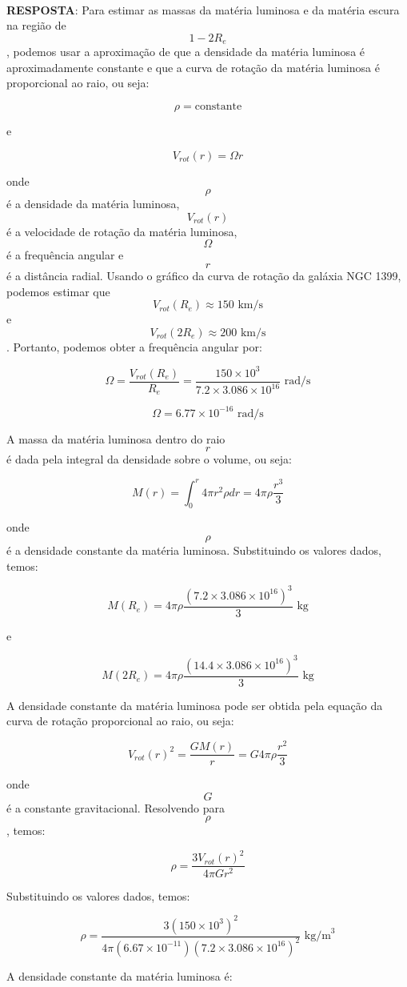 \documentclass[a4paper,12pt]{article}
\begin{document}
\begin{enumerate}
\begin{enumerate}
\noindent\hrulefill\\\textbf{RESPOSTA}: Para estimar as massas da matéria luminosa e da matéria escura na região de $$1-2 R_e$$, podemos usar a aproximação de que a densidade da matéria luminosa é aproximadamente constante e que a curva de rotação da matéria luminosa é proporcional ao raio, ou seja:

$$\rho = \text{constante}$$

e

$$V_{rot}(r) = \Omega r$$

onde $$\rho$$ é a densidade da matéria luminosa, $$V_{rot}(r)$$ é a velocidade de rotação da matéria luminosa, $$\Omega$$ é a frequência angular e $$r$$ é a distância radial. Usando o gráfico da curva de rotação da galáxia NGC 1399, podemos estimar que $$V_{rot}(R_e) \approx 150 \text{ km/s}$$ e $$V_{rot}(2 R_e) \approx 200 \text{ km/s}$$. Portanto, podemos obter a frequência angular por:

$$\Omega = \frac{V_{rot}(R_e)}{R_e} = \frac{150\times 10^3}{7.2\times 3.086\times 10^{16}} \text{ rad/s}$$

$$\Omega = 6.77\times 10^{-16} \text{ rad/s}$$

A massa da matéria luminosa dentro do raio $$r$$ é dada pela integral da densidade sobre o volume, ou seja:

$$M(r) = \int_0^r 4\pi r^2 \rho dr = 4\pi\rho \frac{r^3}{3}$$

onde $$\rho$$ é a densidade constante da matéria luminosa. Substituindo os valores dados, temos:

$$M(R_e) = 4\pi\rho \frac{(7.2\times 3.086\times 10^{16})^3}{3} \text{ kg}$$

e

$$M(2 R_e) = 4\pi\rho \frac{(14.4\times 3.086\times 10^{16})^3}{3} \text{ kg}$$

A densidade constante da matéria luminosa pode ser obtida pela equação da curva de rotação proporcional ao raio, ou seja:

$$V_{rot}(r)^2 = \frac{GM(r)}{r} = G4\pi\rho \frac{r^2}{3}$$

onde $$G$$ é a constante gravitacional. Resolvendo para $$\rho$$, temos:

$$\rho = \frac{3V_{rot}(r)^2}{4\pi Gr^2}$$

Substituindo os valores dados, temos:

$$\rho = \frac{3(150\times 10^3)^2}{4\pi (6.67\times 10^{-11})(7.2\times 3.086\times 10^{16})^2} \text{ kg/m}^3$$

A densidade constante da matéria luminosa é:


\end{enumerate}
\end{enumerate}
\end{document}
